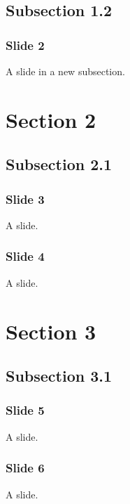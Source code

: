 \documentclass[t,english]{beamer}
\begin{document}

\subsection*{Subsection 1.2}

\begin{frame}[fragile]
\frametitle{Slide 2}


A slide in a new subsection.
\end{frame}



\section*{Section 2}



\subsection*{Subsection 2.1}

\begin{frame}[fragile]
\frametitle{Slide 3}


A slide.
\end{frame}

\begin{frame}[fragile]
\frametitle{Slide 4}


A slide.
\end{frame}



\section*{Section 3}



\subsection*{Subsection 3.1}

\begin{frame}[fragile]
\frametitle{Slide 5}


A slide.
\end{frame}

\begin{frame}[fragile]
\frametitle{Slide 6}


A slide.
\end{frame}
\end{document}

